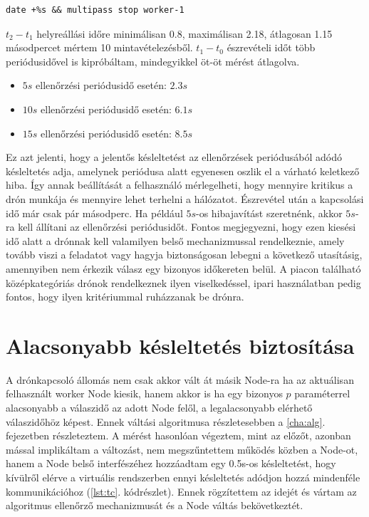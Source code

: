 \begin{lstlisting}[caption={Node kikapcsolása}, label={lst:close}]
date +%s && multipass stop worker-1
\end{lstlisting}

\noindent
$t_2-t_1$ helyreállási időre minimálisan 0.8, maximálisan 2.18, átlagosan 1.15 másodpercet mértem 10 mintavételezésből. $t_1-t_0$ észrevételi időt több periódusidővel is kipróbáltam, mindegyikkel öt-öt mérést átlagolva.
\begin{itemize}
	\item $5s$ ellenőrzési periódusidő esetén: $2.3s$
	\item $10s$ ellenőrzési periódusidő esetén: $6.1s$
	\item $15s$ ellenőrzési periódusidő esetén: $8.5s$
\end{itemize}

\noindent
Ez azt jelenti, hogy a jelentős késleltetést az ellenőrzések periódusából adódó késleltetés adja, amelynek periódusa alatt egyenesen oszlik el a várható keletkező hiba. Így annak beállítását a felhasználó mérlegelheti, hogy mennyire kritikus a drón munkája és mennyire lehet terhelni a hálózatot. Észrevétel után a kapcsolási idő már csak pár másodperc. Ha például $5s$-os hibajavítást szeretnénk, akkor $5s$-ra kell állítani az ellenőrzési periódusidőt. Fontos megjegyezni, hogy ezen kiesési idő alatt a drónnak kell valamilyen belső mechanizmussal rendelkeznie, amely tovább viszi a feladatot vagy hagyja biztonságosan lebegni a következő utasításig, amennyiben nem érkezik válasz egy bizonyos időkereten belül. A piacon található középkategóriás drónok rendelkeznek ilyen viselkedéssel, ipari használatban pedig fontos, hogy ilyen kritériummal ruházzanak be drónra.

\section{Alacsonyabb késleltetés biztosítása}
A drónkapcsoló állomás nem csak akkor vált át másik Node-ra ha az aktuálisan felhasznált worker Node kiesik, hanem akkor is ha egy bizonyos $p$ paraméterrel alacsonyabb a válaszidő az adott Node felől, a legalacsonyabb elérhető válaszidőhöz képest. Ennek váltási algoritmusa részletesebben a \ref{cha:alg}. fejezetben részleteztem. A mérést hasonlóan végeztem, mint az előzőt, azonban mással implikáltam a változást, nem megszűntettem működés közben a Node-ot, hanem a Node belső interfészéhez hozzáadtam egy 0.5s-os késleltetést, hogy kívülről elérve a virtuális rendszerben ennyi késleltetés adódjon hozzá mindenféle kommunikációhoz (\ref{lst:tc}. kódrészlet). Ennek rögzítettem az idejét és vártam az algoritmus ellenőrző mechanizmusát és a Node váltás bekövetkeztét.

